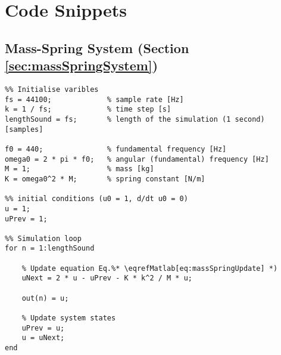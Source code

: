 \chapter{Code Snippets}
\renewcommand\thesection{\thechapter.\arabic{section}}

\section{Mass-Spring System (Section \ref{sec:massSpringSystem})}\label{app:massSpringCode}

\setlstMAT
\begin{lstlisting}
%% Initialise varibles
fs = 44100;             % sample rate [Hz]
k = 1 / fs;             % time step [s]
lengthSound = fs;       % length of the simulation (1 second) [samples]

f0 = 440;               % fundamental frequency [Hz]
omega0 = 2 * pi * f0;   % angular (fundamental) frequency [Hz]
M = 1;                  % mass [kg]
K = omega0^2 * M;       % spring constant [N/m]

%% initial conditions (u0 = 1, d/dt u0 = 0)
u = 1;                  
uPrev = 1;

%% Simulation loop
for n = 1:lengthSound
    
    % Update equation Eq.%* \eqrefMatlab[eq:massSpringUpdate] *)
    uNext = 2 * u - uPrev - K * k^2 / M * u; 
    
    out(n) = u;
    
    % Update system states
    uPrev = u;
    u = uNext;
end
\end{lstlisting}